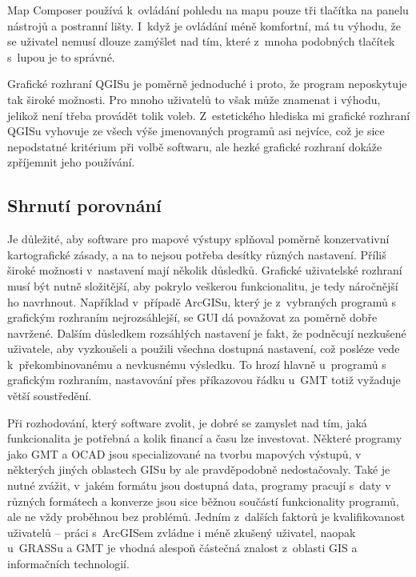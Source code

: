 \documentclass[a4paper,12pt,draft]{article}
\begin{document}
Map Composer používá k~ovládání pohledu na mapu pouze tři tlačítka
na panelu nástrojů a postranní lišty. I~když je ovládání méně
komfortní, má tu výhodu, že se uživatel nemusí dlouze zamýšlet nad
tím, které z~mnoha podobných tlačítek s~lupou je to správné.

Grafické rozhraní QGISu je poměrně jednoduché i proto, že program
neposkytuje tak široké možnosti. Pro mnoho uživatelů to však
může znamenat i výhodu, jelikož není třeba provádět tolik voleb.
Z~estetického hlediska mi grafické rozhraní QGISu vyhovuje ze všech výše
jmenovaných programů asi nejvíce, což je sice nepodstatné kritérium
při volbě softwaru, ale hezké grafické rozhraní dokáže zpříjemnit jeho
používání.

\subsection{Shrnutí porovnání}
Je důležité, aby software pro mapové výstupy splňoval poměrně
konzervativní kartografické zásady, a na to nejsou potřeba
desítky různých nastavení. Příliš široké možnosti v~nastavení
mají několik důsledků. Grafické uživatelské rozhraní musí být nutně
složitější, aby pokrylo veškerou funkcionalitu, je tedy náročnější
ho navrhnout. Například v~případě ArcGISu, který je z~vybraných programů s
grafickým rozhraním nejrozsáhlejší, se GUI dá považovat za poměrně dobře
navržené. 
Dalším důsledkem rozsáhlých nastavení je fakt, že podněcují nezkušené uživatele,
aby vyzkoušeli a použili všechna dostupná nastavení, což posléze vede
k~překombinovanému a nevkusnému výsledku. To hrozí hlavně u~programů s
grafickým rozhraním, nastavování přes příkazovou řádku u~GMT totiž vyžaduje
větší soustředění.

Při rozhodování, který software zvolit, je dobré se zamyslet nad tím, jaká
funkcionalita je potřebná a kolik financí a času lze investovat. Některé
programy jako GMT a OCAD jsou specializované na tvorbu mapových výstupů, v
některých jiných oblastech GISu by ale pravděpodobně nedostačovaly. Také je
nutné zvážit, v~jakém formátu jsou dostupná data, programy pracují s~daty v
různých formátech a konverze jsou sice běžnou součástí funkcionality programů,
ale ne vždy proběhnou bez problémů. Jedním z~dalších faktorů je kvalifikovanost
uživatelů -- práci s~ArcGISem zvládne i méně zkušený uživatel, naopak u~GRASSu
a GMT je vhodná alespoň částečná znalost z~oblasti GIS a informačních
technologií.
\end{document}
